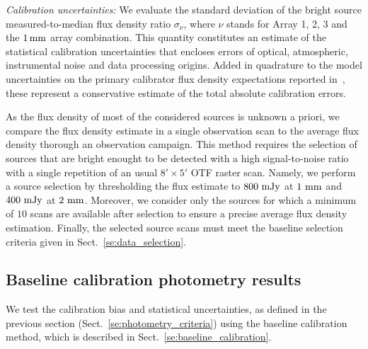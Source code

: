 \noindent \emph{Calibration uncertainties: }We evaluate the standard
deviation of the bright source measured-to-median flux density ratio
$\sigma_{\nu}$, where $\nu$ stands for Array 1, 2, 3 and the
$1\,\rm{mm}$ array combination. This quantity constitutes an estimate
of the statistical calibration uncertainties that encloses errors of
optical, atmospheric, instrumental noise and data processing origins.
Added in quadrature to the model uncertainties on the primary
calibrator flux density expectations reported
in~\citet{Morenothesis,Bendo2013}, %
these represent a conservative estimate of the total absolute
calibration errors.

As the flux density of most of the considered sources is unknown a priori, we
compare the flux density estimate in a single observation scan to the
average flux density thorough an observation campaign. This method
requires the selection of sources that are bright enought to be detected with a high
signal-to-noise ratio with a single repetition of an usual
$8'\times 5'$ OTF raster scan. Namely, we perform a source
selection by thresholding the flux estimate to $800~\rm{mJy}$ at
$1~\rm{mm}$ and $400~\rm{mJy}$ at $2~\rm{mm}$. Moreover, we consider
only the sources for which a minimum of $10$ scans are available after
selection to ensure a precise average flux density
estimation. Finally, the selected source scans must meet the baseline
selection criteria given in Sect.~\ref{se:data_selection}.


\subsection{Baseline calibration photometry results}
\label{se:photometry_baseline}

We test the calibration bias and statistical uncertainties, as defined
in the previous section (Sect.~\ref{se:photometry_criteria}) using the
baseline calibration method, which is described in
Sect.~\ref{se:baseline_calibration}.

